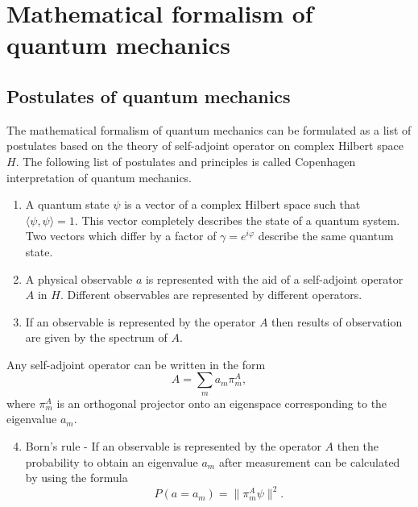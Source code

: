\documentclass[%
master,         %
subf,           %
href,           %
colorlinks=true %
]{disser}
\numberwithin{equation}{section}
\numberwithin{figure}{section}
\begin{document}
\section{Mathematical formalism of quantum mechanics}
\subsection{Postulates of quantum mechanics }
The mathematical formalism of quantum mechanics can be formulated as a list of postulates \cite{Khrennikov_information} based on the theory of self-adjoint operator on complex Hilbert space $H$. The following list of postulates and principles is called Copenhagen interpretation of quantum mechanics.
\begin{enumerate}[label=\bfseries Postulate \arabic*:, align=left]
  \item A quantum state $\psi$ is a vector of a complex Hilbert space such that $\langle\psi, \psi\rangle = 1$. This vector completely describes the state of a quantum system. Two vectors which differ by a factor of $\gamma = e^{i\varphi}$ describe the same quantum state.
  \item A physical observable $a$ is represented with the aid of a self-adjoint operator $A$ in $H$. Different observables are represented by different operators.
  \item If an observable is represented by the operator $A$ then results of observation are given by the spectrum of $A$.
\end{enumerate}
Any self-adjoint operator can be written in the form 
  \[
  A = \sum_m a_m\pi_m^A,
  \]
    where $\pi_m^A$ is an orthogonal projector onto an eigenspace corresponding to the eigenvalue $a_m$.
\begin{enumerate}[label=\bfseries Postulate \arabic*:, align=left]
  \setcounter{enumi}{3}
  \item Born's rule - If an observable is represented by the operator $A$ then the probability to obtain an eigenvalue $a_m$ after measurement can be calculated by using the formula
  \[
  P(a = a_m) = \| \pi_m^A\psi\|^2.
  \]
\end{enumerate}
\end{document}
